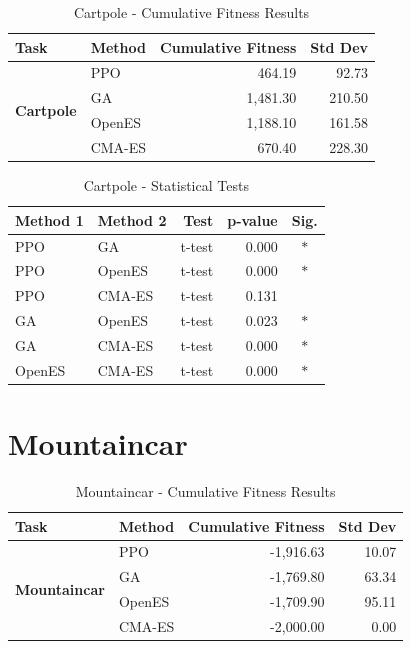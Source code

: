 \documentclass[12pt]{article}
\begin{document}
\begin{table}[h!]
\centering
\caption{Cartpole - Cumulative Fitness Results}
\begin{tabular}{|l|l|r|r|}
\hline
\textbf{Task} & \textbf{Method} & \textbf{Cumulative Fitness} & \textbf{Std Dev} \\
\hline\hline
\multirow{4}{*}{\textbf{Cartpole}} & \rowcolor{ppo!20}PPO & 464.19 & 92.73 \\
\cline{2-4}
 & \rowcolor{ga!20}GA & 1,481.30 & 210.50 \\
\cline{2-4}
 & \rowcolor{openes!20}OpenES & 1,188.10 & 161.58 \\
\cline{2-4}
 & \rowcolor{cmaes!20}CMA-ES & 670.40 & 228.30 \\
\hline
\end{tabular}
\end{table}

\begin{table}[h!]
\centering
\caption{Cartpole - Statistical Tests}
\begin{tabular}{|l|l|r|r|c|}
\hline
\textbf{Method 1} & \textbf{Method 2} & \textbf{Test} & \textbf{p-value} & \textbf{Sig.} \\
\hline\hline
PPO & GA & t-test & 0.000 & $*$ \\
PPO & OpenES & t-test & 0.000 & $*$ \\
PPO & CMA-ES & t-test & 0.131 &  \\
GA & OpenES & t-test & 0.023 & $*$ \\
GA & CMA-ES & t-test & 0.000 & $*$ \\
OpenES & CMA-ES & t-test & 0.000 & $*$ \\
\hline
\end{tabular}
\end{table}

\section{Mountaincar}

\begin{table}[h!]
\centering
\caption{Mountaincar - Cumulative Fitness Results}
\begin{tabular}{|l|l|r|r|}
\hline
\textbf{Task} & \textbf{Method} & \textbf{Cumulative Fitness} & \textbf{Std Dev} \\
\hline\hline
\multirow{4}{*}{\textbf{Mountaincar}} & \rowcolor{ppo!20}PPO & -1,916.63 & 10.07 \\
\cline{2-4}
 & \rowcolor{ga!20}GA & -1,769.80 & 63.34 \\
\cline{2-4}
 & \rowcolor{openes!20}OpenES & -1,709.90 & 95.11 \\
\cline{2-4}
 & \rowcolor{cmaes!20}CMA-ES & -2,000.00 & 0.00 \\
\hline
\end{tabular}
\end{table}
\end{document}

